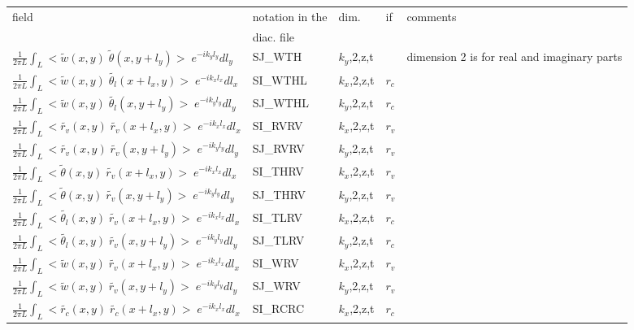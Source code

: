 \begin{center}
\begin{makeimage}
\begin{tabular}{||p{6cm}|>{\centering}p{2.5cm}|>{\centering}p{1.5cm}|>{\centering}p{0.5cm}|p{5cm }||}
\hline
\hline
field & notation in the & dim. &  if  & comments\\
& diac. file &           &  & \\
\hline
\hline

$\frac{1}{2\pi L}\int_L<\tilde{w}(x,y)\;\tilde{\theta}(x,y+l_y)>\;e^{-ik_yl_y}dl_y$ & SJ\_WTH & $k_y$,2,z,t & &\multirow{46}{5cm}{ dimension 2 is for real and imaginary parts} \\
\cline{1-4}
$\frac{1}{2\pi L}\int_L<\tilde{w}(x,y)\;\tilde{\theta_l}(x+l_x,y)>\;e^{-ik_xl_x}dl_x$ & SI\_WTHL & $k_x$,2,z,t & $r_c$ & \\
\cline{1-4}
$\frac{1}{2\pi L}\int_L<\tilde{w}(x,y)\;\tilde{\theta_l}(x,y+l_y)>\;e^{-ik_yl_y}dl_y$ & SJ\_WTHL & $k_y$,2,z,t & $r_c$ & \\
\cline{1-4}
$\frac{1}{2\pi L}\int_L<\tilde{r_v}(x,y)\;\tilde{r_v}(x+l_x,y)>\;e^{-ik_xl_x}dl_x$ & SI\_RVRV & $k_x$,2,z,t & $r_v$ & \\
\cline{1-4}
$\frac{1}{2\pi L}\int_L<\tilde{r_v}(x,y)\;\tilde{r_v}(x,y+l_y)>\;e^{-ik_yl_y}dl_y$ & SJ\_RVRV & $k_y$,2,z,t & $r_v$ & \\
\cline{1-4}
$\frac{1}{2\pi L}\int_L<\tilde{\theta}(x,y)\;\tilde{r_v}(x+l_x,y)>\;e^{-ik_xl_x}dl_x$ & SI\_THRV & $k_x$,2,z,t & $r_v$ & \\
\cline{1-4}
$\frac{1}{2\pi L}\int_L<\tilde{\theta}(x,y)\;\tilde{r_v}(x,y+l_y)>\;e^{-ik_yl_y}dl_y$ & SJ\_THRV & $k_y$,2,z,t & $r_v$ & \\
\cline{1-4}
$\frac{1}{2\pi L}\int_L<\tilde{\theta_l}(x,y)\;\tilde{r_v}(x+l_x,y)>\;e^{-ik_xl_x}dl_x$ & SI\_TLRV & $k_x$,2,z,t & $r_c$ & \\
\cline{1-4}
$\frac{1}{2\pi L}\int_L<\tilde{\theta_l}(x,y)\;\tilde{r_v}(x,y+l_y)>\;e^{-ik_yl_y}dl_y$ & SJ\_TLRV & $k_y$,2,z,t & $r_c$ & \\
\cline{1-4}
$\frac{1}{2\pi L}\int_L<\tilde{w}(x,y)\;\tilde{r_v}(x+l_x,y)>\;e^{-ik_xl_x}dl_x$ & SI\_WRV & $k_x$,2,z,t & $r_v$ & \\
\cline{1-4}
$\frac{1}{2\pi L}\int_L<\tilde{w}(x,y)\;\tilde{r_v}(x,y+l_y)>\;e^{-ik_yl_y}dl_y$ & SJ\_WRV & $k_y$,2,z,t & $r_v$ & \\
\cline{1-4}
$\frac{1}{2\pi L}\int_L<\tilde{r_c}(x,y)\;\tilde{r_c}(x+l_x,y)>\;e^{-ik_xl_x}dl_x$ & SI\_RCRC & $k_x$,2,z,t & $r_c$ & \\

\end{tabular}
\end{makeimage}
\end{center}
